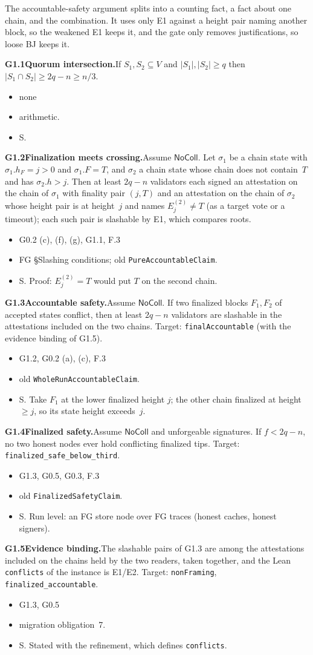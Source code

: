 \documentclass{article}
\newcommand{\dagnode}[6]{%
\par\medskip\noindent\textbf{#1\enspace #2.}\enspace #3
\begin{itemize}[leftmargin=2.2em,itemsep=0pt,topsep=2pt]
\item[\emph{Uses}] #4
\item[\emph{Evid.}] #5
\item[\emph{Task}] #6
\end{itemize}}
\begin{document}
The accountable-safety argument splits into a counting fact, a fact about
one chain, and the combination.  It uses only E1 against a height pair
naming another block, so the weakened E1 keeps it, and the
gate only removes justifications, so loose BJ keeps it.

\dagnode{G1.1}{Quorum intersection}{If $S_1,S_2\subseteq V$ and
$|S_1|,|S_2|\geq q$ then $|S_1\cap S_2|\geq 2q-n\geq n/3$.}
{none}{arithmetic.}{S.}

\dagnode{G1.2}{Finalization meets crossing}{Assume $\mathsf{NoColl}$.  Let $\sigma_1$ be a chain state
with $\sigma_1.h_F=j>0$ and $\sigma_1.F=T$, and $\sigma_2$ a chain state whose
chain does not contain~$T$ and has $\sigma_2.h>j$.  Then at least $2q-n$
validators each signed an attestation on the chain of $\sigma_1$ with finality
pair $(j,T)$ and an attestation on the chain of $\sigma_2$ whose height pair is
at height~$j$ and names $E^{(2)}_j\neq T$ (as a target vote or a timeout);
each such pair is slashable by E1, which compares roots.}
{G0.2 (c), (f), (g), G1.1, F.3}{FG \S Slashing conditions; old
\texttt{PureAccountableClaim}.}{S.  Proof: $E^{(2)}_j=T$ would put $T$ on the
second chain.}

\dagnode{G1.3}{Accountable safety}{Assume $\mathsf{NoColl}$.  If two finalized blocks $F_1,F_2$ of
accepted states conflict, then at least $2q-n$ validators are slashable in the
attestations included on the two chains.  Target:
\texttt{finalAccountable} (with the evidence binding of G1.5).}
{G1.2, G0.2 (a), (c), F.3}{old \texttt{WholeRunAccountableClaim}.}{S.  Take $F_1$
at the lower finalized height $j$; the other chain finalized at height
$\geq j$, so its state height exceeds~$j$.}

\dagnode{G1.4}{Finalized safety}{Assume $\mathsf{NoColl}$ and unforgeable
signatures.  If $f<2q-n$, no two honest nodes ever hold
conflicting finalized tips.  Target: \texttt{finalized\_safe\_below\_third}.}
{G1.3, G0.5, G0.3, F.3}{old \texttt{FinalizedSafetyClaim}.}{S.  Run level: an FG
store node over FG traces (honest caches, honest signers).}

\dagnode{G1.5}{Evidence binding}{The slashable pairs of G1.3 are among the
attestations included on the chains held by the two readers, taken together, and the Lean \texttt{conflicts} of the instance is
E1/E2.  Target: \texttt{nonFraming}, \texttt{finalized\_accountable}.}
{G1.3, G0.5}{migration obligation~7.}{S.  Stated with the
refinement, which defines \texttt{conflicts}.}
\end{document}
